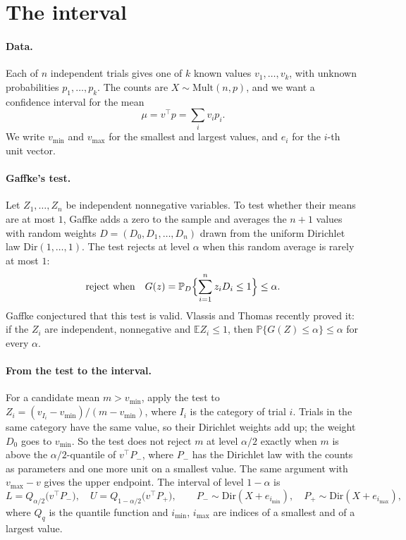 \documentclass[11pt]{article}
\newcommand{\Pp}{\mathbb{P}}
\newcommand{\Ee}{\mathbb{E}}
\newcommand{\Dir}{\mathrm{Dir}}
\newcommand{\Mult}{\mathrm{Mult}}
\begin{document}
\section{The interval}\label{sec:interval}

\paragraph{Data.}
Each of $n$ independent trials gives one of $k$ known values $v_1, \dots, v_k$, with unknown probabilities $p_1, \dots, p_k$.
The counts are $X \sim \Mult(n, p)$, and we want a confidence interval for the mean
\[
  \mu = v^\top p = \sum_i v_i p_i .
\]
We write $v_{\min}$ and $v_{\max}$ for the smallest and largest values, and $e_i$ for the $i$-th unit vector.

\paragraph{Gaffke's test.}
Let $Z_1, \dots, Z_n$ be independent nonnegative variables.
To test whether their means are at most $1$, Gaffke \cite{gaffke2005} adds a zero to the sample and averages the $n + 1$ values with random weights $D = (D_0, D_1, \dots, D_n)$ drawn from the uniform Dirichlet law $\Dir(1, \dots, 1)$.
The test rejects at level $\alpha$ when this random average is rarely at most $1$:
\[
  \text{reject when} \quad G(z) = \Pp_D\Bigl\{\sum_{i=1}^n z_i D_i \le 1\Bigr\} \le \alpha .
\]
Gaffke conjectured that this test is valid.
Vlassis and Thomas \cite{vlassis2026} recently proved it: if the $Z_i$ are independent, nonnegative and $\Ee Z_i \le 1$, then $\Pp\{G(Z) \le \alpha\} \le \alpha$ for every $\alpha$.

\paragraph{From the test to the interval.}
For a candidate mean $m > v_{\min}$, apply the test to $Z_i = (v_{I_i} - v_{\min})/(m - v_{\min})$, where $I_i$ is the category of trial $i$.
Trials in the same category have the same value, so their Dirichlet weights add up; the weight $D_0$ goes to $v_{\min}$.
So the test does not reject $m$ at level $\alpha/2$ exactly when $m$ is above the $\alpha/2$-quantile of $v^\top P_-$, where $P_-$ has the Dirichlet law with the counts as parameters and one more unit on a smallest value.
The same argument with $v_{\max} - v$ gives the upper endpoint.
The interval of level $1 - \alpha$ is
\[
  L = Q_{\alpha/2}\bigl(v^\top P_-\bigr), \quad U = Q_{1-\alpha/2}\bigl(v^\top P_+\bigr), \qquad
  P_- \sim \Dir(X + e_{i_{\min}}), \quad P_+ \sim \Dir(X + e_{i_{\max}}),
\]
where $Q_q$ is the quantile function and $i_{\min}$, $i_{\max}$ are indices of a smallest and of a largest value.
\end{document}
